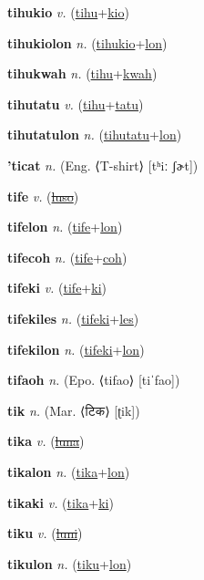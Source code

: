 \textbf{\hypertarget{tihukio}{tihukio}} \textit{v.} (\hyperlink{tihu}{tihu}+\allowbreak \hyperlink{kio}{kio})


\textbf{\hypertarget{tihukiolon}{tihukiolon}} \textit{n.} (\hyperlink{tihukio}{tihukio}+\allowbreak \hyperlink{lon}{lon})


\textbf{\hypertarget{tihukwah}{tihukwah}} \textit{n.} (\hyperlink{tihu}{tihu}+\allowbreak \hyperlink{kwah}{kwah})


\textbf{\hypertarget{tihutatu}{tihutatu}} \textit{v.} (\hyperlink{tihu}{tihu}+\allowbreak \hyperlink{tatu}{tatu})


\textbf{\hypertarget{tihutatulon}{tihutatulon}} \textit{n.} (\hyperlink{tihutatu}{tihutatu}+\allowbreak \hyperlink{lon}{lon})


\textbf{\hypertarget{'ticat}{'ticat}} \textit{n.} (Eng. ⟨T-shirt⟩ [tʰiː ʃɚt])


\textbf{\hypertarget{tife}{tife}} \textit{v.} (\hyperlink{luso}{\sout{luso}})


\textbf{\hypertarget{tifelon}{tifelon}} \textit{n.} (\hyperlink{tife}{tife}+\allowbreak \hyperlink{lon}{lon})


\textbf{\hypertarget{tifecoh}{tifecoh}} \textit{n.} (\hyperlink{tife}{tife}+\allowbreak \hyperlink{coh}{coh})


\textbf{\hypertarget{tifeki}{tifeki}} \textit{v.} (\hyperlink{tife}{tife}+\allowbreak \hyperlink{ki}{ki})


\textbf{\hypertarget{tifekiles}{tifekiles}} \textit{n.} (\hyperlink{tifeki}{tifeki}+\allowbreak \hyperlink{les}{les})


\textbf{\hypertarget{tifekilon}{tifekilon}} \textit{n.} (\hyperlink{tifeki}{tifeki}+\allowbreak \hyperlink{lon}{lon})


\textbf{\hypertarget{tifaoh}{tifaoh}} \textit{n.} (Epo. ⟨tifao⟩ [tiˈfao])


\textbf{\hypertarget{tik}{tik}} \textit{n.} (Mar. ⟨{\devanagari{}टिक}⟩ [ʈik])


\textbf{\hypertarget{tika}{tika}} \textit{v.} (\hyperlink{luna}{\sout{luna}})


\textbf{\hypertarget{tikalon}{tikalon}} \textit{n.} (\hyperlink{tika}{tika}+\allowbreak \hyperlink{lon}{lon})


\textbf{\hypertarget{tikaki}{tikaki}} \textit{v.} (\hyperlink{tika}{tika}+\allowbreak \hyperlink{ki}{ki})


\textbf{\hypertarget{tiku}{tiku}} \textit{v.} (\hyperlink{luni}{\sout{luni}})


\textbf{\hypertarget{tikulon}{tikulon}} \textit{n.} (\hyperlink{tiku}{tiku}+\allowbreak \hyperlink{lon}{lon})


